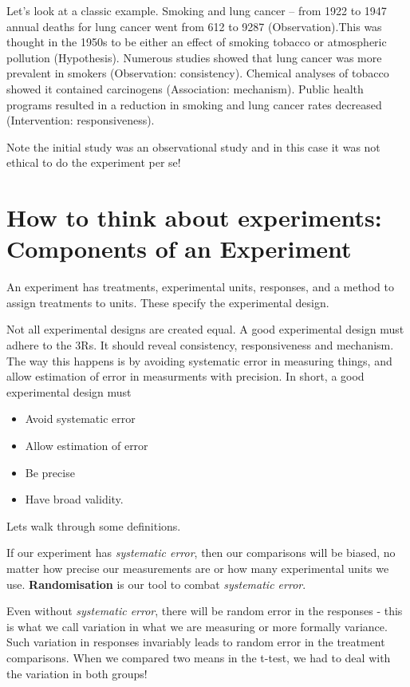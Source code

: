 \documentclass[
]{book}
\providecommand{\tightlist}{%
  \setlength{\itemsep}{0pt}\setlength{\parskip}{0pt}}
\begin{document}
Let's look at a classic example. Smoking and lung cancer -- from 1922 to 1947 annual deaths for lung cancer went from 612 to 9287 (Observation).This was thought in the 1950s to be either an effect of smoking tobacco or atmospheric pollution (Hypothesis). Numerous studies showed that lung cancer was more prevalent in smokers (Observation: consistency). Chemical analyses of tobacco showed it contained carcinogens (Association: mechanism). Public health programs resulted in a reduction in smoking and lung cancer rates decreased (Intervention: responsiveness).

Note the initial study was an observational study and in this case it was not ethical to do the experiment per se!

\hypertarget{how-to-think-about-experiments-components-of-an-experiment}{%
\section{How to think about experiments: Components of an Experiment}\label{how-to-think-about-experiments-components-of-an-experiment}}

An experiment has treatments, experimental units, responses, and a method to assign treatments to units. These specify the experimental design.

Not all experimental designs are created equal. A good experimental design must adhere to the 3Rs. It should reveal consistency, responsiveness and mechanism. The way this happens is by avoiding systematic error in measuring things, and allow estimation of error in measurments with precision. In short, a good experimental design must

\begin{itemize}
\tightlist
\item
  Avoid systematic error
\item
  Allow estimation of error
\item
  Be precise
\item
  Have broad validity.
\end{itemize}

Lets walk through some definitions.

If our experiment has \emph{systematic error}, then our comparisons will be biased, no matter how precise our measurements are or how many experimental units we use. \textbf{Randomisation} is our tool to combat \emph{systematic error}.

Even without \emph{systematic error}, there will be random error in the responses - this is what we call variation in what we are measuring or more formally variance. Such variation in responses invariably leads to random error in the treatment comparisons. When we compared two means in the t-test, we had to deal with the variation in both groups!
\end{document}
